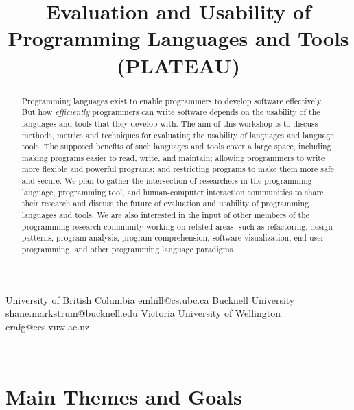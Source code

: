 \documentclass[authorpermission]{sigplanconf}
\begin{document}
\title{Evaluation and Usability of Programming Languages and Tools (PLATEAU)}

           {University of British Columbia}
           {emhill@cs.ubc.ca}
           {Bucknell University}
           {shane.markstrum@bucknell.edu}
           {Victoria University of Wellington}
           {craig@ecs.vuw.ac.nz}

\date{}

\maketitle
\begin{abstract}

  Programming languages exist to enable programmers to develop
  software effectively.  But how \emph{efficiently} programmers can
  write software depends on the usability of the languages and tools
  that they develop with.  The aim of this workshop is to discuss
  methods, metrics and techniques for evaluating the usability of
  languages and language tools.  The supposed benefits of such
  languages and tools cover a large space, including making programs
  easier to read, write, and maintain; allowing programmers to write
  more flexible and powerful programs; and restricting programs to
  make them more safe and secure. We plan to gather the intersection
  of researchers in the programming language, programming tool, and
  human-computer interaction communities to share their research and
  discuss the future of evaluation and usability of programming
  languages and tools. We are also interested in the input of other
  members of the programming research community working on related
  areas, such as refactoring, design patterns, program analysis,
  program comprehension, software visualization, end-user programming,
  and other programming language paradigms.

\end{abstract}

\\




\section{Main Themes and Goals}
\end{document}
